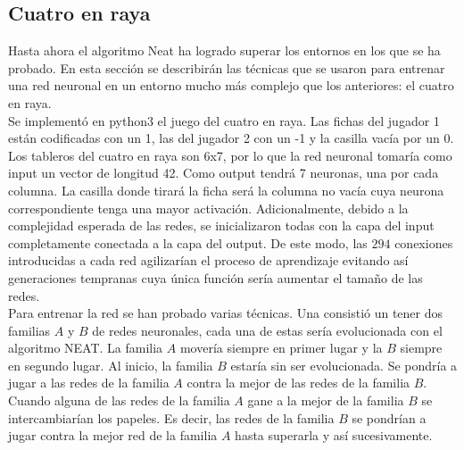 \documentclass{article}
\begin{document}


\subsection{Cuatro en raya}
\label{4r}
Hasta ahora el algoritmo Neat ha logrado superar los entornos en los que se ha probado. En esta sección se describirán las técnicas que se usaron para entrenar una red neuronal en un entorno mucho más complejo que los anteriores: el cuatro en raya.\\ 

Se implementó en python3 el juego del cuatro en raya. Las fichas del jugador 1 están codificadas con un 1, las del jugador 2 con un -1 y la casilla vacía por un 0. Los tableros del cuatro en raya son 6x7, por lo que la red neuronal tomaría como input un vector de longitud 42. Como output tendrá 7 neuronas, una por cada columna. La casilla donde tirará la ficha será la columna no vacía cuya neurona correspondiente tenga una mayor activación. Adicionalmente, debido a la complejidad esperada de las redes, se inicializaron todas con la capa del input completamente conectada a la capa del output. De este modo, las $294$ conexiones introducidas a cada red agilizarían el proceso de aprendizaje evitando así generaciones tempranas cuya única función sería aumentar el tamaño de las redes.\\

Para entrenar la red se han probado varias técnicas. Una consistió un tener dos familias $A$ y $B$ de redes neuronales, cada una de estas sería evolucionada con el algoritmo NEAT. La familia $A$ movería siempre en primer lugar y la $B$ siempre en segundo lugar. Al inicio, la familia $B$ estaría sin ser evolucionada. Se pondría a jugar a las redes de la familia $A$ contra la mejor de las redes de la familia $B$. Cuando alguna de las redes de la familia $A$ gane a la mejor de la familia $B$ se intercambiarían los papeles. Es decir, las redes de la familia $B$ se pondrían a jugar contra la mejor red de la familia $A$ hasta superarla y así sucesivamente.\\
\end{document}
